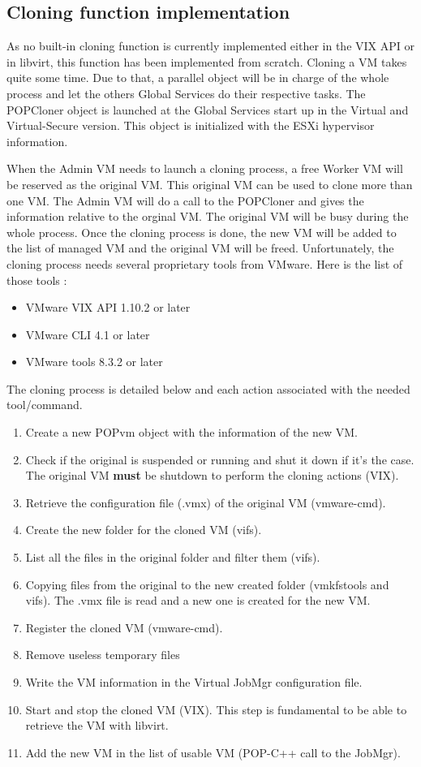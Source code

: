 \pagebreak
\subsection{Cloning function implementation}
As no built-in cloning function is currently implemented either in the VIX API or in libvirt, this function has been implemented from scratch. Cloning a VM takes quite some time. Due to that, a parallel object will be in charge of the whole process and let the others Global Services do their respective tasks. The POPCloner object is launched at the Global Services start up in the Virtual and Virtual-Secure version. This object is initialized with the ESXi hypervisor information.\s

When the Admin VM needs to launch a cloning process, a free Worker VM will be reserved as the original VM. This original VM can be used to clone more than one VM. The Admin VM will do a call to the POPCloner and gives the information relative to the orginal VM. The original VM will be busy during the whole process. Once the cloning process is done, the new VM will be added to the list of managed VM and the original VM will be freed. Unfortunately, the cloning process needs several proprietary tools from VMware. Here is the list of those tools : \s

\begin{itemize}
\item VMware VIX API 1.10.2 or later
\item VMware CLI 4.1 or later
\item VMware tools 8.3.2 or later
\end{itemize}\s


The cloning process is detailed below and each action associated with the needed tool/command.

\begin{enumerate}
\item Create a new POPvm object with the information of the new VM.
\item Check if the original is suspended or running and shut it down if it's the case. The original VM \textbf{must} be shutdown to perform the cloning actions (VIX).
\item Retrieve the configuration file (.vmx) of the original VM (vmware-cmd).
\item Create the new folder for the cloned VM (vifs).
\item List all the files in the original folder and filter them (vifs).
\item Copying files from the original to the new created folder (vmkfstools and vifs).
\subitem The .vmx file is read and a new one is created for the new VM.
\item Register the cloned VM (vmware-cmd).
\item Remove useless temporary files
\item Write the VM information in the Virtual JobMgr configuration file. 
\item Start and stop the cloned VM (VIX). This step is fundamental to be able to retrieve the VM with libvirt. 
\item Add the new VM in the list of usable VM (POP-C++ call to the JobMgr).
\end{enumerate}

